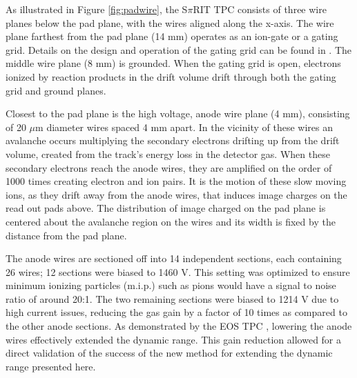 \documentclass[review]{elsarticle}
\begin{document}
As illustrated in Figure \ref{fig:padwire}, the S$\pi$RIT TPC consists of three wire planes below the pad plane, with the wires aligned along the x-axis. The wire plane farthest from the pad plane (14 mm) operates as an ion-gate or a gating grid. Details on the design and operation of the gating grid can be found in \cite{suwat}. The middle wire plane (8 mm) is grounded. When the gating grid is open, electrons ionized by reaction products in the drift volume drift through both the gating grid and ground planes. 

Closest to the pad plane is the high voltage, anode wire plane (4 mm), consisting of 20 $\mu$m diameter wires spaced 4 mm apart. In the vicinity of these wires an avalanche occurs multiplying the secondary electrons drifting up from the drift volume, created from the track's energy loss in the detector gas. When these secondary electrons reach the anode wires, they are amplified on the order of 1000 times creating electron and ion pairs. It is the motion of these slow moving ions, as they drift away from the anode wires, that induces image charges on the read out pads above. The distribution of image charged on the pad plane is centered about the avalanche region on the wires and its width is fixed by the distance from the pad plane. 

The anode wires are sectioned off into 14 independent sections, each containing 26 wires; 12 sections were biased to 1460 V. This setting was optimized to ensure minimum ionizing particles (m.i.p.) such as pions would have a signal to noise ratio of around 20:1. The two remaining sections were biased to 1214 V due to high current issues, reducing the gas gain by a factor of 10 times as compared to the other anode sections. As demonstrated by the EOS TPC \citep{eos}, lowering the anode wires effectively extended the dynamic range.  This gain reduction allowed for a direct validation of the success of the new method for extending the dynamic range presented here. 
\end{document}
